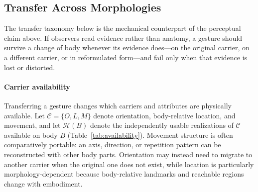 \documentclass[letterpaper,10pt,conference]{ieeeconf}
\begin{document}
\subsection{Transfer Across Morphologies}
\label{sec3.3}
The transfer taxonomy below is the mechanical counterpart of the perceptual claim above. If observers read evidence rather than anatomy, a gesture should survive a change of body whenever its evidence does---on the original carrier, on a different carrier, or in reformulated form---and fail only when that evidence is lost or distorted.

\paragraph{Carrier availability}
Transferring a gesture changes which carriers and attributes are physically available. Let $\mathcal{C}=\{O,L,M\}$ denote orientation, body-relative location, and movement, and let $\mathcal{H}(B)$ denote the independently usable realizations of $\mathcal{C}$ available on body $B$ (Table~\ref{tab:availability}). Movement structure is often comparatively portable: an axis, direction, or repetition pattern can be reconstructed with other body parts. Orientation may instead need to migrate to another carrier when the original one does not exist, while location is particularly morphology-dependent because body-relative landmarks and reachable regions change with embodiment.
\end{document}
